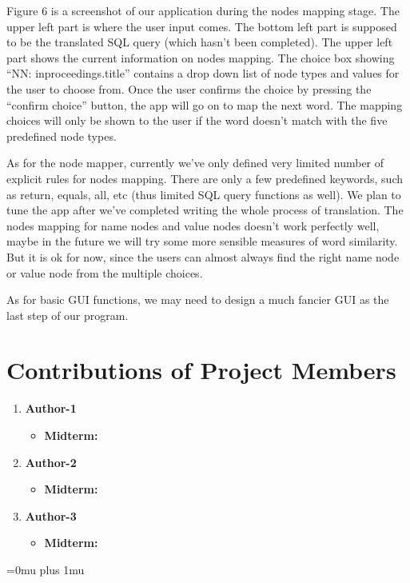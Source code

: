 \documentclass[twocolumn]{article}
\begin{document}
Figure 6 is a screenshot of our application during the nodes mapping stage. The upper left part is where the user input comes. The bottom left part is supposed to be the translated SQL query (which hasn’t been completed). The upper left part shows the current information on nodes mapping. The choice box showing “NN: inproceedings.title” contains a drop down list of node types and values for the user to choose from. Once the user confirms the choice by pressing the “confirm choice” button, the app will go on to map the next word. The mapping choices will only be shown to the user if the word doesn’t match with the five predefined node types.

As for the node mapper, currently we’ve only defined very limited number of explicit rules for nodes mapping. There are only a few predefined keywords, such as return, equals, all, etc (thus limited SQL query functions as well). We plan to tune the app after we’ve completed writing the whole process of translation. The nodes mapping for name nodes and value nodes doesn’t work perfectly well, maybe in the future we will try some more sensible measures of word similarity. But it is ok for now, since the users can almost always find the right name node or value node from the multiple choices. 

As for basic GUI functions, we may need to design a much fancier GUI as the last step of our program.

\section{Contributions of Project Members}

\begin{enumerate}
\item {\bf Author-1}
\begin{itemize}
\item {\bf Midterm:}
\end{itemize}
\item {\bf Author-2}
\begin{itemize}
\item {\bf Midterm:}
\end{itemize}
\item {\bf Author-3}
\begin{itemize}
\item {\bf Midterm:}
\end{itemize}
\end{enumerate}

\Urlmuskip=0mu plus 1mu\relax


\end{document}

